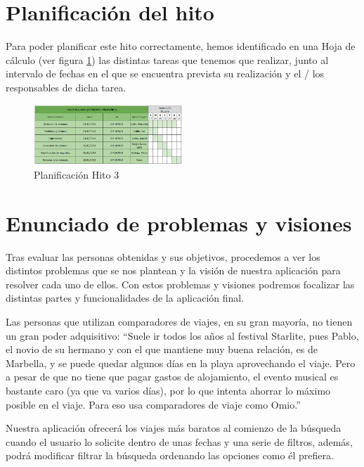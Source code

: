 \section{Planificación del hito}
Para poder planificar este hito correctamente, hemos identificado en una Hoja de cálculo (ver figura \ref{fig:planif-hito3}) las distintas tareas que tenemos que 
realizar, junto al intervalo de fechas en el que se encuentra prevista su realización y el / los responsables de dicha tarea.
\begin{figure}[H]
    \centering 
    \includegraphics[width=0.5\textwidth]{./Imagenes/Planificaciones/Planif-hito3.png}
    \caption{Planificación Hito 3}
    \label{fig:planif-hito3}
\end{figure}

\section{Enunciado de problemas y visiones}

Tras evaluar las personas obtenidas y sus objetivos, procedemos a ver los distintos problemas que se nos plantean y la visión de nuestra aplicación para resolver cada uno de ellos. Con estos problemas y visiones podremos focalizar las distintas partes y funcionalidades de la aplicación final.

\begin{problema}

    Las personas que utilizan comparadores de viajes, en su gran mayoría, no tienen un gran poder adquisitivo: ``Suele ir todos los años al festival Starlite, pues Pablo, el novio de su hermano y con el que mantiene muy buena relación, es de Marbella, y se puede quedar algunos días en la playa aprovechando el viaje. Pero a pesar de que no tiene que pagar gastos de alojamiento, el evento musical es bastante caro (ya que va varios días), por lo que intenta ahorrar lo máximo posible en el viaje. Para eso usa comparadores de viaje como Omio.''

    {\centering\begin{vision}
    Nuestra aplicación ofrecerá los viajes más baratos al comienzo de la búsqueda cuando el usuario lo solicite dentro de unas fechas y una serie de filtros, además, podrá modificar filtrar la búsqueda ordenando las opciones como él prefiera.
    \end{vision}}
    \end{problema}
    
